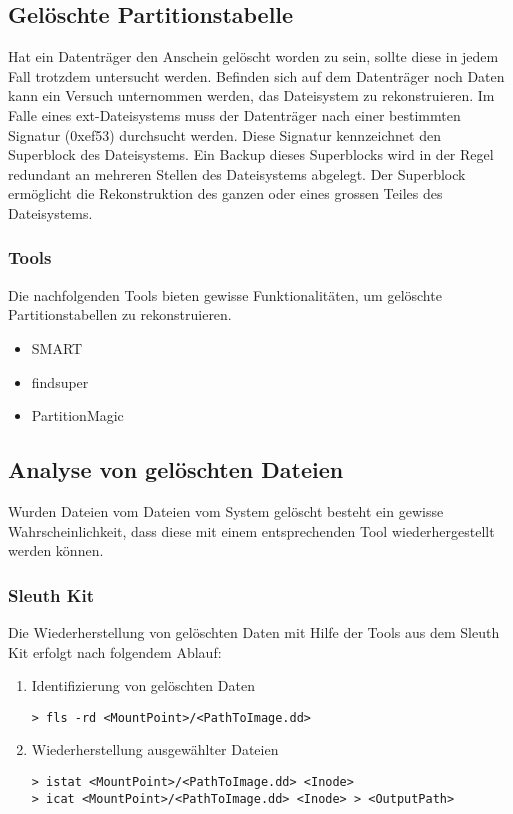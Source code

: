 	
\subsection{Gelöschte Partitionstabelle}
Hat ein Datenträger den Anschein gelöscht worden zu sein, sollte diese in jedem Fall trotzdem untersucht werden. Befinden sich auf dem Datenträger noch Daten kann ein Versuch unternommen werden, das Dateisystem zu rekonstruieren. Im Falle eines ext-Dateisystems muss der Datenträger nach einer bestimmten Signatur (0xef53) durchsucht werden. Diese Signatur kennzeichnet den Superblock des Dateisystems. Ein Backup dieses Superblocks wird in der Regel redundant an mehreren Stellen des Dateisystems abgelegt. Der Superblock ermöglicht die Rekonstruktion des ganzen oder eines grossen Teiles des Dateisystems.

\subsubsection{Tools} 
Die nachfolgenden Tools bieten gewisse Funktionalitäten, um gelöschte Partitionstabellen zu rekonstruieren.

\begin{itemize}
\item SMART
\item findsuper
\item PartitionMagic
\end{itemize}


\subsection{Analyse von gelöschten Dateien}
Wurden Dateien vom Dateien vom System gelöscht besteht ein gewisse Wahrscheinlichkeit, dass diese mit einem entsprechenden Tool wiederhergestellt werden können.

\subsubsection{Sleuth Kit}
Die Wiederherstellung von gelöschten Daten mit Hilfe der Tools aus dem Sleuth Kit erfolgt nach folgendem Ablauf:
 
\begin{enumerate}
\item Identifizierung von gelöschten Daten
\begin{lstlisting}
> fls -rd <MountPoint>/<PathToImage.dd>
\end{lstlisting}
\item Wiederherstellung ausgewählter Dateien
\begin{lstlisting}
> istat <MountPoint>/<PathToImage.dd> <Inode>
> icat <MountPoint>/<PathToImage.dd> <Inode> > <OutputPath>
\end{lstlisting}
\end{enumerate}

